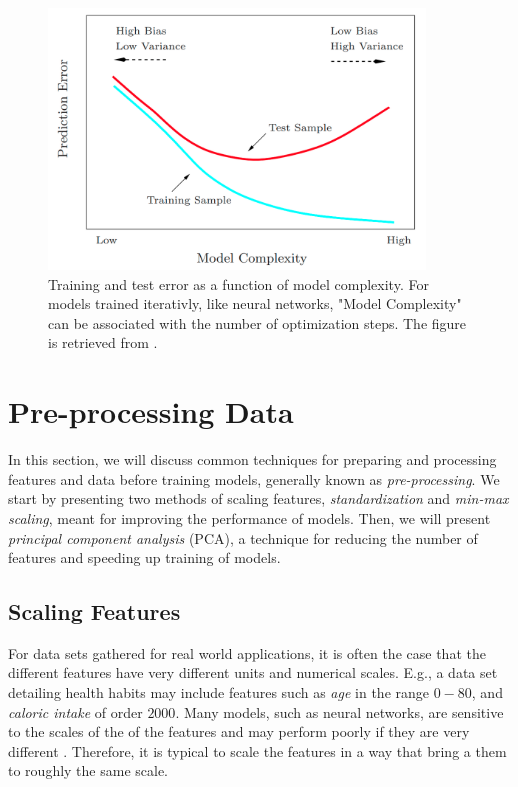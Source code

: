 \begin{figure}[H]
    \centering
    \includegraphics[width=10cm]{latex/figures/train_test.png}
    \caption{Training and test error as a function of model complexity. For models trained iterativly, like neural networks, "Model Complexity" can be associated with the number of optimization steps. The figure is retrieved from \citet{hastie01statisticallearning}.}
    \label{fig:train_test}
\end{figure}


\section{Pre-processing Data}\label{sec:Pre-processing Features Theory}
In this section, we will discuss common techniques for preparing and processing features and data before training models, generally known as \emph{pre-processing}. We start by presenting two methods of scaling features, \emph{standardization} and \emph{min-max scaling}, meant for improving the performance of models. Then, we will present \emph{principal component analysis} (PCA), a technique for reducing the number of features and speeding up training of models. 

\subsection{Scaling Features}\label{sec:Scaling Features}
For data sets gathered for real world applications, it is often the case that the different features have very different units and numerical scales. E.g., a data set detailing health habits may include features such as \emph{age} in the range $0-80$, and \emph{caloric intake} of order $2000$. Many models, such as neural networks, are sensitive to the scales of the of the features and may perform poorly if they are very different \cite{hands-on}. Therefore, it is typical to scale the features in a way that bring a them to roughly the same scale. 

